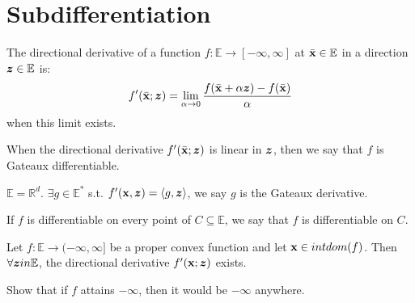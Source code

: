 \documentclass[11pt]{article}
\begin{document}
\newpage
\section{Subdifferentiation}
\begin{definition}
    The directional derivative of a function $f: \mathbb{E} \to [-\infty,\infty]$ at $\bar{{\mathbf{x}}} \in \mathbb{E}$
    in a direction ${\bm{z}} \in \mathbb{E}$ is:
    \begin{align*}
        f'(\bar{{\mathbf{x}}}; {\bm{z}}) = \lim_{\alpha \to 0} \frac{f(\bar{{\mathbf{x}}}+\alpha {\bm{z}}) - f(\bar{{\mathbf{x}}})}{\alpha}
    \end{align*}
    when this limit exists.

    When the directional derivative $f'(\bar{{\mathbf{x}}}; {\bm{z}})$ is linear in ${\bm{z}}$, then we say that 
    $f$ is Gateaux differentiable.

    $\mathbb{E} = \mathbb{R}^{d}$. $\exists g \in \mathbb{E}^{*}$ s.t. $f'({\mathbf{x}},{\bm{z}}) = \langle 
        g, {\bm{z}}
    \rangle$, we say $g$ is the Gateaux derivative.

    If $f$ is differentiable on every point of $C \subseteq \mathbb{E}$, we say that $f$ is differentiable on
    $C$.
\end{definition}

\begin{theorem}
    Let $f: \mathbb{E} \to (-\infty,\infty]$ be a proper convex function and let ${\mathbf{x}} \in intdom(f)$.
    Then $\forall {\bm{z}} in \mathbb{E}$, the directional derivative $f'({\mathbf{x}};{\bm{z}})$ exists.

\end{theorem}
\begin{exercise}
    Show that if $f$ attains $-\infty$, then it would be $-\infty$ anywhere.
\end{exercise}
\end{document}
